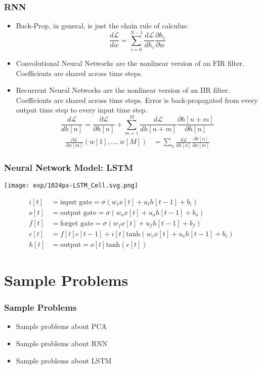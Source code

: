\documentclass{beamer}
\begin{document}
\begin{frame}
  \frametitle{RNN}
  \begin{itemize}
  \item Back-Prop, in general, is just the chain rule of calculus:
    \begin{displaymath}
      \frac{d{\mathcal L}}{dw} = \sum_{i=0}^{N-1}\frac{d{\mathcal L}}{dh_i}\frac{\partial h_i}{\partial w}
    \end{displaymath}
  \item Convolutional Neural Networks are the nonlinear version of an FIR filter.
    Coefficients are shared across time steps.
  \item Recurrent Neural Networks are the nonlinear version of an IIR filter.  
    Coefficients are shared across time steps.
    Error is back-propagated from every output time step to every input time step.
    \begin{displaymath}
      \frac{d{\mathcal L}}{dh[n]}
      =\frac{\partial {\mathcal L}}{\partial h[n]}+
      \sum_{m=1}^{M}\frac{d{\mathcal L}}{dh[n+m]}\frac{\partial h[n+m]}{\partial h[n]}
    \end{displaymath}
    \begin{align*}
      \frac{\partial{\mathcal L}}{\partial w[m]}\left(w[1],\ldots,w[M]\right)
      &=\sum_{n}\frac{d{\mathcal L}}{dh[n]}\frac{\partial h[n]}{\partial w[m]}
    \end{align*}
  \end{itemize}
\end{frame}

\begin{frame}
  \frametitle{Neural Network Model: LSTM}
  \centerline{\texttt{[image: exp/1024px-LSTM\_Cell.svg.png]}}
  \begin{align*}
    i[t] &=\mbox{input gate}=\sigma(w_i x[t]+u_i h[t-1]+b_i)\\
    o[t] &=\mbox{output gate}=\sigma(w_o x[t]+u_o h[t-1]+b_o)\\
    f[t] &=\mbox{forget gate}=\sigma(w_f x[t]+u_f h[t-1]+b_f)\\
    c[t] &=f[t]c[t-1]+i[t]\mbox{tanh}\left(w_cx[t]+u_ch[t-1]+b_c\right)\\
    h[t] &=\mbox{output}=o[t]\mbox{tanh}(c[t])
  \end{align*}
\end{frame}

\section[Sample Problems]{Sample Problems}
\setcounter{subsection}{1}

\begin{frame}
  \frametitle{Sample Problems}
  \begin{itemize}
  \item Sample problems about PCA
  \item Sample problems about RNN
  \item Sample problems about LSTM
  \end{itemize}
\end{frame}
\end{document}
